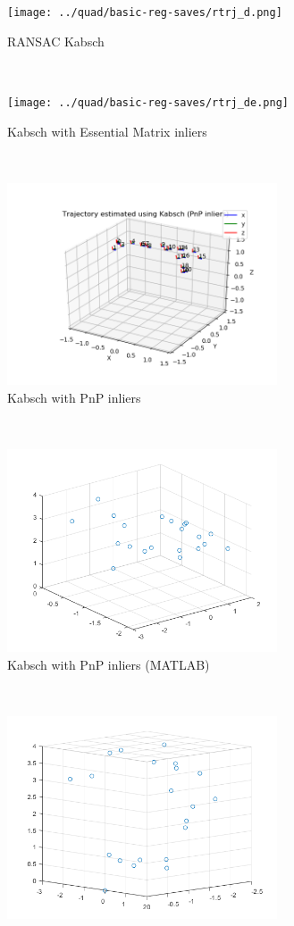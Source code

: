\documentclass[12pt,a4paper]{article}
\begin{document}
\begin{figure}[h]
\begin{subfigure}[t]{\textwidth}
  \centering
    \texttt{[image: ../quad/basic-reg-saves/rtrj\_d.png]}
  \caption{RANSAC Kabsch}
  \end{subfigure}%
  \\
  \begin{subfigure}[t]{0.5\textwidth}
  \centering
    \texttt{[image: ../quad/basic-reg-saves/rtrj\_de.png]}
  \caption{Kabsch with Essential Matrix inliers}
  \end{subfigure}%
  ~
  \begin{subfigure}[t]{0.5\textwidth}
  \centering
    \includegraphics[width=80mm]{../quad/basic-reg-saves/rtrj_dp.png}
  \caption{Kabsch with PnP inliers}
  \end{subfigure}
  \\
  \begin{subfigure}[t]{0.5\textwidth}
  \centering
    \includegraphics[width=80mm]{../quad/kabsch/unaligned.png}
  \caption{Kabsch with PnP inliers (MATLAB)}
  \end{subfigure}%
  ~
  \begin{subfigure}[t]{0.5\textwidth}
  \centering
    \includegraphics[width=80mm]{../quad/kabsch/aligned.png}

\end{subfigure}
\end{figure}
\end{document}
